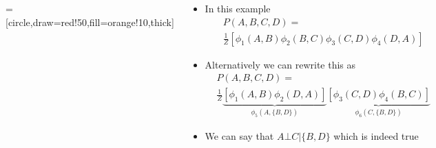 \begin{frame}
	\begin{columns}
		\begin{overlayarea}{\textwidth}{\textheight}
			\begin{center}
					=[circle,draw=red!50,fill=orange!10,thick]
				\end{center}
		\end{overlayarea}
		\begin{overlayarea}{\textwidth}{\textheight}
			\begin{itemize}[<+->]\justifying
				\item In this example
				\begin{align*}
					&P(A,B,C,D) = \\
					&\frac{1}{Z} [ \phi_1(A,B) \phi_2(B,C) \phi_3(C,D) \phi_4(D,A)]
				\end{align*}
				\item Alternatively we can rewrite this as 
				\begin{align*}
					&P(A,B,C,D) = \\
					&\frac{1}{Z} \underbrace{[ \phi_1(A,B) \phi_2(D,A) ]}_{\phi_5(A,\{B,D\})} \underbrace{[\phi_3(C,D) \phi_4(B,C)]}_{\phi_6(C,\{B,D\})}
				\end{align*}
				\item We can say that $A \bot C|\{B,D\}$ which is indeed true
			\end{itemize}
		\end{overlayarea}
	\end{columns}
\end{frame}


